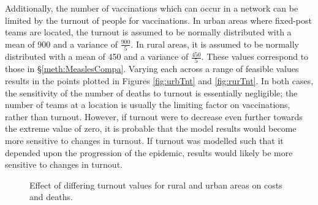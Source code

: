 Additionally, the number of vaccinations which can occur in a network can be limited by the turnout of people for vaccinations. In urban areas where fixed-post teams are located, the turnout is assumed to be normally distributed with a mean of 900 and a variance of $\frac{900}{5}$. In rural areas, it is assumed to be normally distributed with a mean of 450 and a variance of $\frac{450}{5}$. These values correspond to those in \S \ref{meth:MeaslesCompa}. Varying each across a range of feasible values results in the points plotted in Figures \ref{fig:urbTnt} and \ref{fig:rurTnt}. In both cases, the sensitivity of the number of deaths to turnout is essentially negligible; the number of teams at a location is usually the limiting factor on vaccinations, rather than turnout. However, if turnout were to decrease even further towards the extreme value of zero, it is probable that the model results would become more sensitive to changes in turnout. If turnout was modelled such that it depended upon the progression of the epidemic, results would likely be more sensitive to changes in turnout. 

\begin{figure}[ht!]{\textwidth}
    \centering
\caption{Effect of differing turnout values for rural and urban areas on costs and deaths.}
\end{figure}

